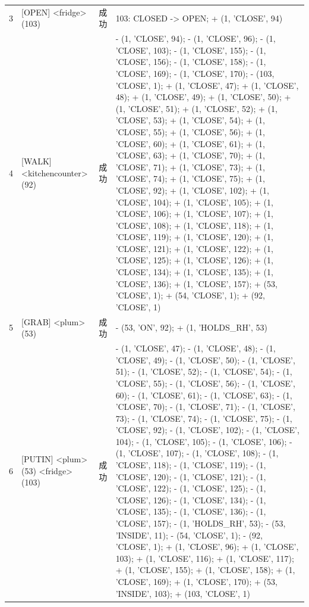 {\begin{longtable}{rp{.28\linewidth}lp{.48\linewidth}}
3 & [OPEN] \textless{}fridge\textgreater{} (103) & 成功 & 103: CLOSED -\textgreater{} OPEN; + (1, 'CLOSE', 94) \\
4 & [WALK] \textless{}kitchencounter\textgreater{} (92) & 成功 & - (1, 'CLOSE', 94); - (1, 'CLOSE', 96); - (1, 'CLOSE', 103); - (1, 'CLOSE', 155); - (1, 'CLOSE', 156); - (1, 'CLOSE', 158); - (1, 'CLOSE', 169); - (1, 'CLOSE', 170); - (103, 'CLOSE', 1); + (1, 'CLOSE', 47); + (1, 'CLOSE', 48); + (1, 'CLOSE', 49); + (1, 'CLOSE', 50); + (1, 'CLOSE', 51); + (1, 'CLOSE', 52); + (1, 'CLOSE', 53); + (1, 'CLOSE', 54); + (1, 'CLOSE', 55); + (1, 'CLOSE', 56); + (1, 'CLOSE', 60); + (1, 'CLOSE', 61); + (1, 'CLOSE', 63); + (1, 'CLOSE', 70); + (1, 'CLOSE', 71); + (1, 'CLOSE', 73); + (1, 'CLOSE', 74); + (1, 'CLOSE', 75); + (1, 'CLOSE', 92); + (1, 'CLOSE', 102); + (1, 'CLOSE', 104); + (1, 'CLOSE', 105); + (1, 'CLOSE', 106); + (1, 'CLOSE', 107); + (1, 'CLOSE', 108); + (1, 'CLOSE', 118); + (1, 'CLOSE', 119); + (1, 'CLOSE', 120); + (1, 'CLOSE', 121); + (1, 'CLOSE', 122); + (1, 'CLOSE', 125); + (1, 'CLOSE', 126); + (1, 'CLOSE', 134); + (1, 'CLOSE', 135); + (1, 'CLOSE', 136); + (1, 'CLOSE', 157); + (53, 'CLOSE', 1); + (54, 'CLOSE', 1); + (92, 'CLOSE', 1) \\
5 & [GRAB] \textless{}plum\textgreater{} (53) & 成功 & - (53, 'ON', 92); + (1, 'HOLDS\_RH', 53) \\
6 & [PUTIN] \textless{}plum\textgreater{} (53) \textless{}fridge\textgreater{} (103) & 成功 & - (1, 'CLOSE', 47); - (1, 'CLOSE', 48); - (1, 'CLOSE', 49); - (1, 'CLOSE', 50); - (1, 'CLOSE', 51); - (1, 'CLOSE', 52); - (1, 'CLOSE', 54); - (1, 'CLOSE', 55); - (1, 'CLOSE', 56); - (1, 'CLOSE', 60); - (1, 'CLOSE', 61); - (1, 'CLOSE', 63); - (1, 'CLOSE', 70); - (1, 'CLOSE', 71); - (1, 'CLOSE', 73); - (1, 'CLOSE', 74); - (1, 'CLOSE', 75); - (1, 'CLOSE', 92); - (1, 'CLOSE', 102); - (1, 'CLOSE', 104); - (1, 'CLOSE', 105); - (1, 'CLOSE', 106); - (1, 'CLOSE', 107); - (1, 'CLOSE', 108); - (1, 'CLOSE', 118); - (1, 'CLOSE', 119); - (1, 'CLOSE', 120); - (1, 'CLOSE', 121); - (1, 'CLOSE', 122); - (1, 'CLOSE', 125); - (1, 'CLOSE', 126); - (1, 'CLOSE', 134); - (1, 'CLOSE', 135); - (1, 'CLOSE', 136); - (1, 'CLOSE', 157); - (1, 'HOLDS\_RH', 53); - (53, 'INSIDE', 11); - (54, 'CLOSE', 1); - (92, 'CLOSE', 1); + (1, 'CLOSE', 96); + (1, 'CLOSE', 103); + (1, 'CLOSE', 116); + (1, 'CLOSE', 117); + (1, 'CLOSE', 155); + (1, 'CLOSE', 158); + (1, 'CLOSE', 169); + (1, 'CLOSE', 170); + (53, 'INSIDE', 103); + (103, 'CLOSE', 1) \\

\end{longtable}}
